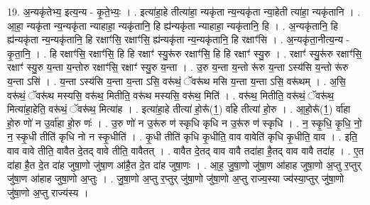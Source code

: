 \documentclass[17pt]{extarticle}
\begin{document}
19. अ॒न्यकृ॑तेभ्य॒ इत्य॒न्य - कृ॒ते॒भ्यः॒ । . इत्या॑हा॒हे तीत्या॑हा॒ न्यकृ॑ता न्य॒न्यकृ॑ता न्या॒हेती त्या॑हा॒ न्यकृ॑तानि । . आ॒हा॒ न्यकृ॑ता न्य॒न्यकृ॑ता न्याहाहा॒ न्यकृ॑तानि॒ हि ह्य॑न्यकृ॑ता न्याहाहा॒ न्यकृ॑तानि॒ हि । . अ॒न्यकृ॑तानि॒ हि ह्य॑न्यकृ॑ता न्य॒न्यकृ॑तानि॒ हि रक्षाꣳ॑सि॒ रक्षाꣳ॑सि॒ ह्य॑न्यकृ॑ता न्य॒न्यकृ॑तानि॒ हि रक्षाꣳ॑सि । . अ॒न्यकृ॑ता॒नीत्य॒न्य - कृ॒ता॒नि॒ । . हि रक्षाꣳ॑सि॒ रक्षाꣳ॑सि॒ हि हि रक्षाꣳ॑ स्यु॒रू॑रु रक्षाꣳ॑सि॒ हि हि रक्षाꣳ॑ स्यु॒रु । . रक्षाꣳ॑ स्यु॒रू॑रु रक्षाꣳ॑सि॒ रक्षाꣳ॑ स्यु॒रु य॒न्ता य॒न्तोरु रक्षाꣳ॑सि॒ रक्षाꣳ॑ स्यु॒रु य॒न्ता । . उ॒रु य॒न्ता य॒न्तो रू॑रु य॒न्ता ऽस्य॑सि य॒न्तो रू॑रु य॒न्ता ऽसि॑ । . य॒न्ता ऽस्य॑सि य॒न्ता य॒न्ता ऽसि॒ वरू॑थं॒ ॅवरू॑थ मसि य॒न्ता य॒न्ता ऽसि॒ वरू॑थम् । . अ॒सि॒ वरू॑थं॒ ॅवरू॑थ मस्यसि॒ वरू॑थ॒ मितीति॒ वरू॑थ मस्यसि॒ वरू॑थ॒ मिति॑ । . वरू॑थ॒ मितीति॒ वरू॑थं॒ ॅवरू॑थ॒ मित्या॑हा॒हेति॒ वरू॑थं॒ ॅवरू॑थ॒ मित्या॑ह । . इत्या॑हा॒हे तीत्या॑ हो॒रू᳚(1॒) र्वा॑हे तीत्या॑ हो॒रु । . आ॒हो॒रू᳚(1॒) र्वा॑हा हो॒रु णो॑ न उ॒र्वा॑हा हो॒रु णः॑ । . उ॒रु णो॑ न उ॒रू॑रु ण॑ स्कृधि कृधि न उ॒रू॑रु ण॑ स्कृधि । . न॒ स्कृ॒धि॒ कृ॒धि॒ नो॒ न॒ स्कृ॒धी तीति॑ कृधि नो न स्कृ॒धीति॑ । . कृ॒धी तीति॑ कृधि कृ॒धीति॒ वाव वावेति॑ कृधि कृ॒धीति॒ वाव । . इति॒ वाव वावे तीति॒ वावैत दे॒तद् वावे तीति॒ वावैतत् । . वावैत दे॒तद् वाव वावै तदा॑हा है॒तद् वाव वावै तदा॑ह । . ए॒त दा॑हा है॒त दे॒त दा॑ह जुषा॒णो जु॑षा॒ण आ॑है॒त दे॒त दा॑ह जुषा॒णः । . आ॒ह॒ जु॒षा॒णो जु॑षा॒ण आ॑हाह जुषा॒णो अ॒प्तु र॒प्तुर् जु॑षा॒ण आ॑हाह जुषा॒णो अ॒प्तुः । . जु॒षा॒णो अ॒प्तु र॒प्तुर् जु॑षा॒णो जु॑षा॒णो अ॒प्तु राज्य॒स्या ज्य॑स्या॒प्तुर् जु॑षा॒णो जु॑षा॒णो अ॒प्तु राज्य॑स्य । \newline
\end{document}
